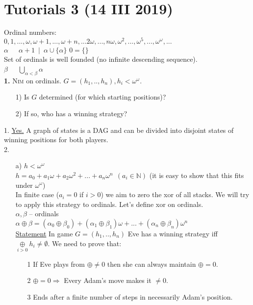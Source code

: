 \section{Tutorials 3 (14 III 2019)}
Ordinal numbers:\\
$0, 1, ..., \omega, \omega+1, ..., \omega+n, ... 2 \omega, ..., n \omega, \omega^2, ..., \omega^5, ..., \omega^\omega, ...$\\
$\alpha$\ \ \ $\alpha + 1$\ $|$\ $\alpha \cup \{\alpha\}$  $0 = \{\}$\\
Set of ordinals is well founded (no infinite descending sequence).\\
$\beta$\ \ \ $\bigcup\limits_{\alpha < \beta} \alpha$\\

\noindent
\textbf{1.} \textsc{Nim} on ordinals. $G = (h_1, .., h_n), h_i < \omega^\omega$.
\begin{itemize}
	\item[1)] Is $G$ determined (for which starting positions)?
	\item[2)] If so, who has a winning strategy?
\end{itemize}
1. \underline{Yes.} A graph of states is a DAG and can be divided into disjoint states of winning positions for both players.\\
2.
\begin{itemize}
	\item[a)] $h < \omega^\omega$\\
		$h = a_0 + a_1\omega + a_2\omega^2 + ... + a_n\omega^n\ \ (a_i \in \mathbb{N})$ (it is easy to show that this fits under $\omega^\omega$)\\
		In finite case ($a_i = 0$ if $i > 0$) we aim to zero the xor of all stacks. We will try to apply this strategy to ordinals. Let's
		define xor on ordinals.\\
		$\alpha, \beta$ -- ordinals\\
		$\alpha \oplus \beta = (\alpha_0 \oplus \beta_0) + (\alpha_1 \oplus \beta_1)\omega + ... + (\alpha_n \oplus \beta_n)\omega^n$\\
		\underline{Statement} In game $G = (h_1, .., h_n)$ Eve has a winning strategy iff $\underset{i > 0}{\oplus} h_i \neq \emptyset$.
		We need to prove that:
		\begin{itemize}
			\item[1\textdegree] If Eve plays from $\oplus \neq 0$ then she can always maintain $\oplus = 0$.
			\item[2\textdegree] $\oplus = 0 \Rightarrow$ Every Adam's move makes it $\neq 0$.
			\item[3\textdegree] Ends after a finite number of steps in necessarily Adam's position.
		\end{itemize}
\end{itemize}

